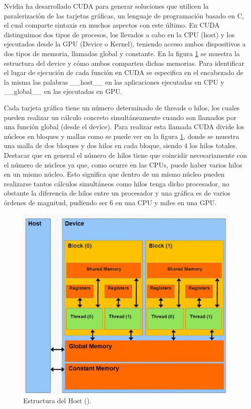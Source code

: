 \documentclass[11pt,a4paper,twoside,pdf]{article}
\numberwithin{equation}{section}
\begin{document}
Nvidia ha desarrollado CUDA para generar soluciones que utilicen la paralerización de las tarjetas gráficas, un lenguaje de programación basado en C, el cual comparte sintaxis en muchos aspectos con este último. En CUDA distinguimos dos tipos de procesos, los llevados a cabo en la CPU (host) y los ejecutados desde la GPU (Device o Kernel), teniendo acceso ambos dispositivos a dos tipos de memoria, llamadas global y constante. En la figura \ref{fig:componentes gpu} se muestra la estructura del device y cómo ambos comparten dichas memorias. Para identificar el lugar de ejecución de cada función en CUDA se especifica en el encabezado de la misma las palabras \_\_host\_\_ en las aplicaciones ejecutadas en CPU y \_\_global\_\_ en las ejecutadas en GPU.

Cada tarjeta gráfica tiene un número determinado de threads o hilos, los cuales pueden realizar un cálculo concreto simultáneamente cuando son llamados por una función global (desde el device). Para realizar esta llamada CUDA divide los núcleos en bloques y mallas como se puede ver en la figura \ref{fig:componentes gpu}, donde se muestra una malla de dos bloques y dos hilos en cada bloque, siendo 4 los hilos totales. Destacar que en general el número de hilos tiene que coincidir necesariamente con el número de núcleos ya que, como ocurre en las CPUs, puede haber varios hilos en un mismo núcleo. Esto significa que dentro de un mísmo núcleo pueden realizarse tantos cálculos simultáneos como hilos tenga dicho procesador, no obstante la diferencia de hilos entre un procesador y una gráfica es de varios órdenes de magnitud, pudiendo ser 6 en una CPU y miles en una GPU.

\begin{figure}[h]
\centering
\includegraphics[width=10 cm]{Nvidia-Device_Structure.jpg}				
\caption{Estructura del Host (\cite{web}). }
\label{fig:componentes gpu}
\end{figure}
\noindent
\end{document}
